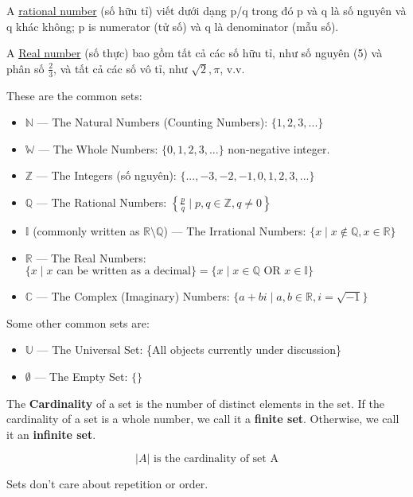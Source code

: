 A \href{https://en.wikipedia.org/wiki/Rational_number}{rational number} (số hữu tỉ) viết dưới dạng p/q trong đó p và q là số nguyên và q khác không; p is numerator (tử số) và q là denominator (mẫu số).

A \href{https://en.wikipedia.org/wiki/Real_number}{Real number} (số thực) bao gồm tất cả các số hữu tỉ, như số nguyên (5) và phân số \(\frac{2}{3}\), và tất cả các số vô tỉ, như \(\sqrt{2}, \pi\), v.v.

These are the common sets:

\begin{itemize}
  \item $\mathbb{N}$ --- The Natural Numbers (Counting Numbers): $\{1,2,3,...\}$
  \item $\mathbb{W}$ --- The Whole Numbers: $\{0,1,2,3,...\}$ non-negative integer.
  \item $\mathbb{Z}$ --- The Integers (số nguyên): $\{...,-3,-2,-1,0,1,2,3,...\}$
  \item $\mathbb{Q}$ --- The Rational Numbers: $\left\{ \frac{p}{q} \mid p,q \in \mathbb{Z}, q \neq 0 \right\}$
  \item $\mathbb{I}$ (commonly written as $\mathbb{R} \setminus \mathbb{Q}$) --- The Irrational Numbers: $\{x \mid x \not\in \mathbb{Q}, x \in \mathbb{R}\}$
  \item $\mathbb{R}$ --- The Real Numbers: $\{x \mid x \text{ can be written as a decimal}\} = \{x \mid x \in \mathbb{Q} \text{ OR } x \in \mathbb{I}\}$
  \item $\mathbb{C}$ --- The Complex (Imaginary) Numbers: $\{a+bi \mid a,b \in \mathbb{R} , i=\sqrt{-1}\}$
\end{itemize}

Some other common sets are:

\begin{itemize}
  \item $\mathbb{U}$ --- The Universal Set: \{All objects currently under discussion\}
  \item $\emptyset$ --- The Empty Set: \(\{\}\)
\end{itemize}

The \textbf{Cardinality} of a set is the number of distinct elements in the set. If the cardinality of a set is a whole number, we call it a \textbf{finite set}. Otherwise, we call it an \textbf{infinite set}.

\[|A| \text{ is the cardinality of set A}\]

Sets don't care about repetition or order.


